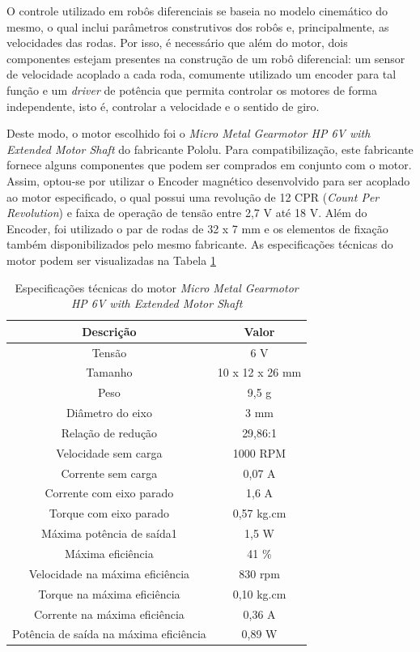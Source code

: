 O controle utilizado em robôs diferenciais se baseia no modelo cinemático do mesmo, o qual inclui parâmetros construtivos dos robôs e, principalmente, as velocidades das rodas. Por isso, é necessário que além do motor, dois componentes estejam presentes na construção de um robô diferencial: um sensor de velocidade acoplado a cada roda, comumente utilizado um encoder para tal função e um \textit{driver} de potência que permita controlar os motores de forma independente, isto é, controlar a velocidade e o sentido de giro.

Deste modo, o motor escolhido foi o \textit{Micro Metal Gearmotor HP 6V with Extended Motor Shaft} do fabricante Pololu. Para compatibilização, este fabricante fornece alguns componentes que podem ser comprados em conjunto com o motor. Assim, optou-se por utilizar o Encoder magnético desenvolvido para ser acoplado ao motor especificado, o qual possui uma revolução de 12 CPR (\textit{Count Per Revolution}) e faixa de operação de tensão entre 2,7 V até 18 V. Além do Encoder, foi utilizado o par de rodas de 32 x 7 mm e os elementos de fixação também disponibilizados pelo mesmo fabricante. As especificações técnicas do motor podem ser visualizadas na Tabela \ref{tab:especificacao_do_motor}

\begin{table}[H]
	\centering
	\captionsetup{justification=centering}
	\caption{Especificações técnicas do motor \textit{Micro Metal Gearmotor HP 6V with Extended Motor Shaft}}
	\label{tab:especificacao_do_motor}
	\begin{tabular}{c|c}
		\hline
		\textbf{Descrição} & \textbf{Valor} \\ \hline
		Tensão & 6 V \\ \hline
		Tamanho & 10 x 12 x 26 mm \\ \hline
		Peso & 9,5 g \\ \hline
		Diâmetro do eixo & 3 mm \\ \hline
		Relação de redução & 29,86:1 \\ \hline
		Velocidade sem carga & 1000 RPM \\ \hline
		Corrente sem carga & 0,07 A \\ \hline
		Corrente com eixo parado & 1,6 A \\ \hline
		Torque com eixo parado & 0,57 kg.cm \\ \hline
		Máxima potência de saída1 & 1,5 W \\ \hline
		Máxima eficiência & 41 \% \\ \hline
		Velocidade na máxima eficiência & 830 rpm \\ \hline
		Torque na máxima eficiência & 0,10 kg.cm \\ \hline
		Corrente na máxima eficiência & 0,36 A \\ \hline
		Potência de saída na máxima eficiência & 0,89 W \\ \hline
	\end{tabular}
\end{table}

